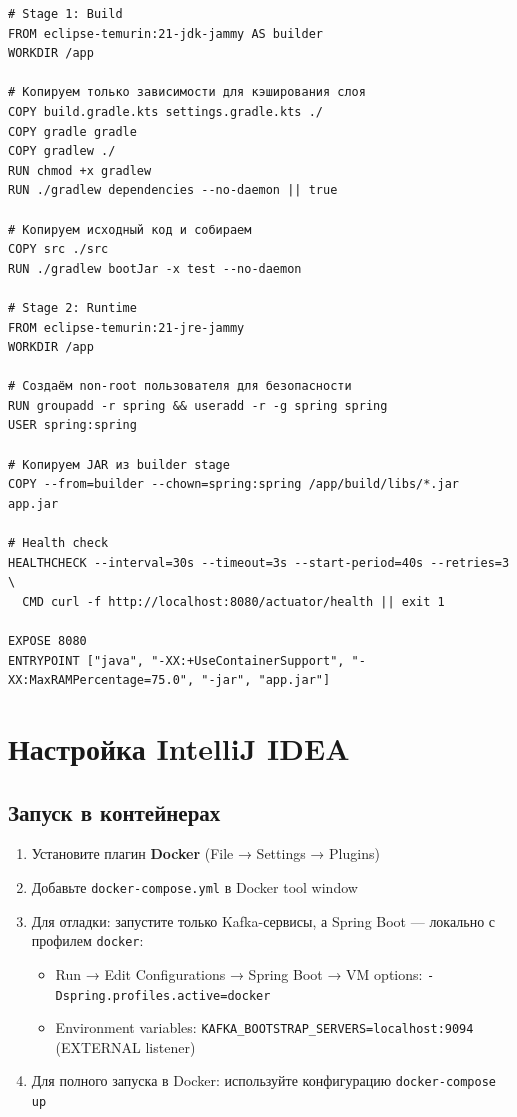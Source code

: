\documentclass[a4paper,12pt]{article}
\begin{document}
\begin{lstlisting}[style=yaml,caption=Dockerfile для Spring Boot]
# Stage 1: Build
FROM eclipse-temurin:21-jdk-jammy AS builder
WORKDIR /app

# Копируем только зависимости для кэширования слоя
COPY build.gradle.kts settings.gradle.kts ./
COPY gradle gradle
COPY gradlew ./
RUN chmod +x gradlew
RUN ./gradlew dependencies --no-daemon || true

# Копируем исходный код и собираем
COPY src ./src
RUN ./gradlew bootJar -x test --no-daemon

# Stage 2: Runtime
FROM eclipse-temurin:21-jre-jammy
WORKDIR /app

# Создаём non-root пользователя для безопасности
RUN groupadd -r spring && useradd -r -g spring spring
USER spring:spring

# Копируем JAR из builder stage
COPY --from=builder --chown=spring:spring /app/build/libs/*.jar app.jar

# Health check
HEALTHCHECK --interval=30s --timeout=3s --start-period=40s --retries=3 \
  CMD curl -f http://localhost:8080/actuator/health || exit 1

EXPOSE 8080
ENTRYPOINT ["java", "-XX:+UseContainerSupport", "-XX:MaxRAMPercentage=75.0", "-jar", "app.jar"]
\end{lstlisting}

\section{Настройка IntelliJ IDEA}
\subsection{Запуск в контейнерах}
\begin{enumerate}
    \item Установите плагин \textbf{Docker} (File → Settings → Plugins)
    \item Добавьте \texttt{docker-compose.yml} в Docker tool window
    \item Для отладки: запустите только Kafka-сервисы, а Spring Boot — локально с профилем \texttt{docker}:
    \begin{itemize}
        \item Run → Edit Configurations → Spring Boot → VM options: \texttt{-Dspring.profiles.active=docker}
        \item Environment variables: \texttt{KAFKA\_BOOTSTRAP\_SERVERS=localhost:9094} (EXTERNAL listener)
    \end{itemize}
    \item Для полного запуска в Docker: используйте конфигурацию \texttt{docker-compose up}
\end{enumerate}
\end{document}
